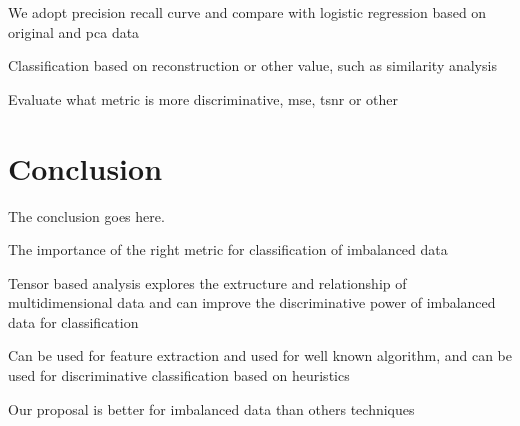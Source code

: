 We adopt precision recall curve and compare with logistic regression based on original and pca data

Classification based on reconstruction or other value, such as similarity analysis

Evaluate what metric is more discriminative, mse, tsnr or other

\section{Conclusion}

The conclusion goes here.

The importance of the right metric for classification of imbalanced data

Tensor based analysis explores the extructure and relationship of multidimensional data and can improve the discriminative power of imbalanced data for classification

Can be used for feature extraction and used for well known algorithm,  and can be used for discriminative classification based on heuristics

Our proposal is better for imbalanced data than others techniques